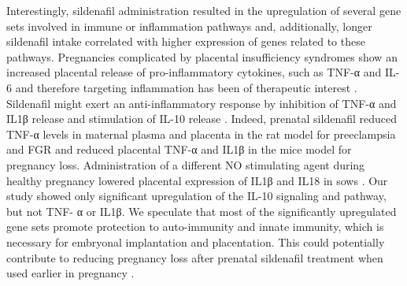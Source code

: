 \documentclass[authordate, empirical]{jote-new-article}
\begin{document}
Interestingly, sildenafil administration resulted in the upregulation of several gene sets involved in immune or inflammation pathways and, additionally, longer sildenafil intake correlated with higher expression of genes related to these pathways. Pregnancies complicated by placental insufficiency syndromes show an increased placental release of pro-inflammatory cytokines, such as TNF-α and IL-6 and therefore targeting inflammation has been of therapeutic interest \parencites{George2011}{Oyston2015}{Kniotek2017}. Sildenafil might exert an anti-inflammatory response by inhibition of TNF-α and IL1β release and stimulation of IL-10 release \parencites{Ribaudo2016}{Kniotek2017}. Indeed, prenatal sildenafil reduced TNF-α levels in maternal plasma and placenta in the rat model for preeclampsia and FGR \parencites{Gillis2016} and reduced placental TNF-α and IL1β in the mice model for pregnancy loss. Administration of a different NO stimulating agent during healthy pregnancy lowered placental expression of IL1β and IL18 in sows \parencites{Luo2019}. Our study showed only significant upregulation of the IL-10 signaling and pathway, but not TNF- α or IL1β. We speculate that most of the significantly upregulated gene sets promote protection to auto-immunity and innate immunity, which is necessary for embryonal implantation and placentation. This could potentially contribute to reducing pregnancy loss after prenatal sildenafil treatment when used earlier in pregnancy \parencites{Luna2015}.
\end{document}
